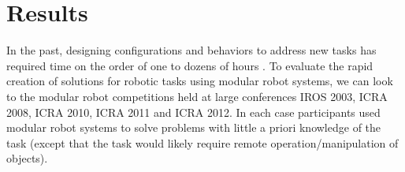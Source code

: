 \documentclass[graybox]{svmult}
\begin{document}
% 
% 


\section{Results}
In the past, designing configurations and behaviors to address new tasks has required
time on the order of one to dozens of hours \cite{sastra2011using}.  To evaluate the rapid creation of solutions for robotic tasks using modular robot systems, we can look to the modular robot competitions held at large conferences IROS 2003, ICRA 2008, ICRA 2010, ICRA 2011 and ICRA 2012. In each case participants used modular robot systems to solve problems with little a priori knowledge of the task (except that the task would likely require remote operation/manipulation of objects).
\end{document}
